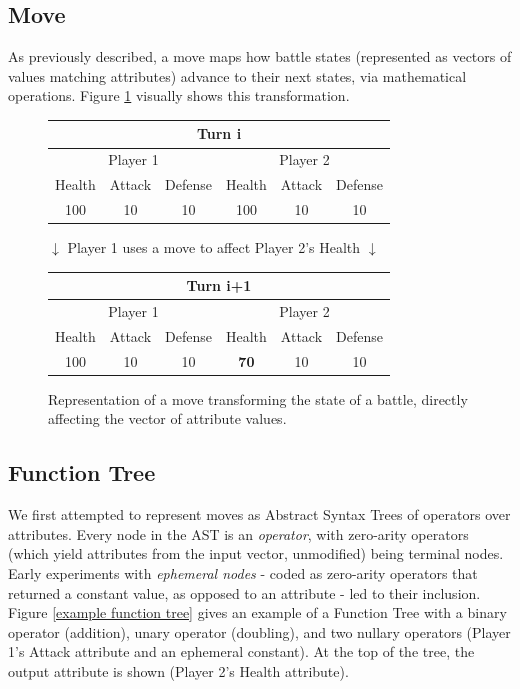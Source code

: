 \documentclass{acm_proc_article-sp}
\begin{document}
\subsection{Move}

As previously described, a move maps how battle states (represented as vectors of values matching attributes) advance to their next states, via mathematical operations. Figure \ref{move-state-transformation} visually shows this transformation.


\begin{figure}[h!]
    \centering
    \begin{tabular}{ | c | c | c || c | c | c | }
        \hline
        \multicolumn{6}{|c|}{Turn i} \\ \hline
        \multicolumn{3}{|c||}{Player 1} & \multicolumn{3}{|c|}{Player 2} \\ \hline
        Health & Attack & Defense & Health & Attack & Defense \\ \hline
        100 & 10 & 10 & 100 & 10 & 10 \\
        \hline
    \end{tabular}
        \smallskip
        {\large $\downarrow$} Player 1 uses a move to affect Player 2's Health        {\large $\downarrow$}
        \smallskip
    \begin{tabular}{ | c | c | c || c | c | c | }
        \hline
        \multicolumn{6}{|c|}{Turn i+1} \\ \hline
        \multicolumn{3}{|c||}{Player 1} & \multicolumn{3}{|c|}{Player 2} \\ \hline
        Health & Attack & Defense & Health & Attack & Defense \\ \hline
        100 & 10 & 10 & \textbf{70} & 10 & 10 \\
        \hline
    \end{tabular}
    \caption{Representation of a move transforming the state of a battle, directly affecting the vector of attribute values.}
    \label{move-state-transformation}
\end{figure}

\subsection{Function Tree}

We first attempted to represent moves as Abstract Syntax Trees of operators over attributes. Every node in the AST is an \textit{operator}, with zero-arity operators (which yield attributes from the input vector, unmodified) being terminal nodes. Early experiments with \textit{ephemeral nodes} - coded as zero-arity operators that returned a constant value, as opposed to an attribute - led to their inclusion. Figure \ref{example function tree} gives an example of a Function Tree with a binary operator (addition), unary operator (doubling), and two nullary operators (Player 1's Attack attribute and an ephemeral constant). At the top of the tree, the output attribute is shown (Player 2's Health attribute). 
\end{document}
